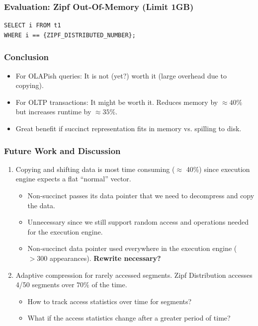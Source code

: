 \documentclass[aspectratio=43]{beamer}
\begin{document}
\begin{frame}[fragile]
    \frametitle{Evaluation: Zipf Out-Of-Memory (Limit 1GB)}
\begin{lstlisting}[style=SQL]
SELECT i FROM t1 
WHERE i == {ZIPF_DISTRIBUTED_NUMBER};
\end{lstlisting}

\scalebox{0.9}{

}
\end{frame}


\begin{frame}
    \frametitle{Conclusion}

    \begin{itemize}
        \item For OLAPish queries: It is not (yet?) worth it (large overhead due to copying).
        \item For OLTP transactions:  It might be worth it. Reduces memory by $\approx 40\%$ but increases runtime by $\approx 35\%$.
        \item Great benefit if succinct representation fits in memory vs. spilling to disk.
    \end{itemize}
\end{frame}


\begin{frame}
    \frametitle{Future Work and Discussion}

    \begin{enumerate}

    \item Copying and shifting data is most time consuming ($\approx$ 40\%) since execution engine expects a 
    flat ``normal'' vector.
    \begin{itemize}
        \item Non-succinct passes its data pointer that we need to decompress and copy the data.
        \item Unnecessary since we still support random access and operations needed for the execution engine.
        \item Non-succinct data pointer used everywhere in the execution engine ($>300$ appearances). 
        \textbf{Rewrite necessary?}
    \end{itemize}

    \vspace{0.3cm} 

    \item Adaptive compression for rarely accessed segments. 
    Zipf Distribution accesses 4/50 segments over $70\%$ of the time.
    \begin{itemize}
        \item How to track access statistics over time for segments?
        \item What if the access statistics change after a greater period of time?
    \end{itemize}
\end{enumerate}

\end{frame}
\end{document}

